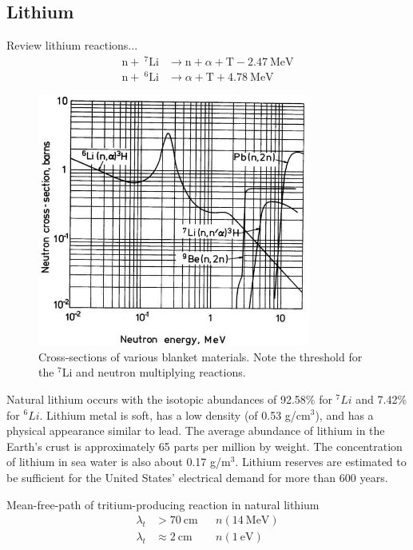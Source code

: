 \documentclass[11pt]{report} %
\begin{document}
\subsection{Lithium}
Review lithium reactions...
\begin{align}
\mathrm{n} + ~^7\mathrm{Li} &\xrightarrow ~\mathrm{n}+\alpha + \mathrm{T} -2.47~\text{MeV}\label{eq:Li7T}\\
\mathrm{n} + ~^6\mathrm{Li} &\xrightarrow ~ \alpha + \mathrm{T} +4.78~\text{MeV} \label{eq:Li6T}
\end{align}

\begin{figure}
\centering
\includegraphics[width=0.8\textwidth]{../images/breeding_xsecs} 
\caption{Cross-sections of various blanket materials. Note the threshold for the $^7$Li and neutron multiplying reactions.}
\label{fig:xsects}
\end{figure}

Natural lithium occurs with the isotopic abundances of 92.58\% for $^7Li$ and 7.42\% for $^6Li$. Lithium metal is soft, has a low density (of 0.53 g/cm$^3$), and has a physical appearance similar to lead. The average abundance of lithium in the Earth's crust is approximately 65 parts per million by weight. The concentration of lithium in sea water is also about 0.17 g/m$^3$. Lithium reserves are estimated to be sufficient for the United States' electrical demand for more than 600 years.

Mean-free-path of tritium-producing reaction in natural lithium
\begin{align*}
\lambda_t & > \SI{70}{\centi\meter} && n(\SI{14}{\mega\electronvolt})\\
\lambda_t & \approx \SI{2}{\centi\meter} && n(\SI{1}{\electronvolt}) 
\end{align*}
\end{document}
